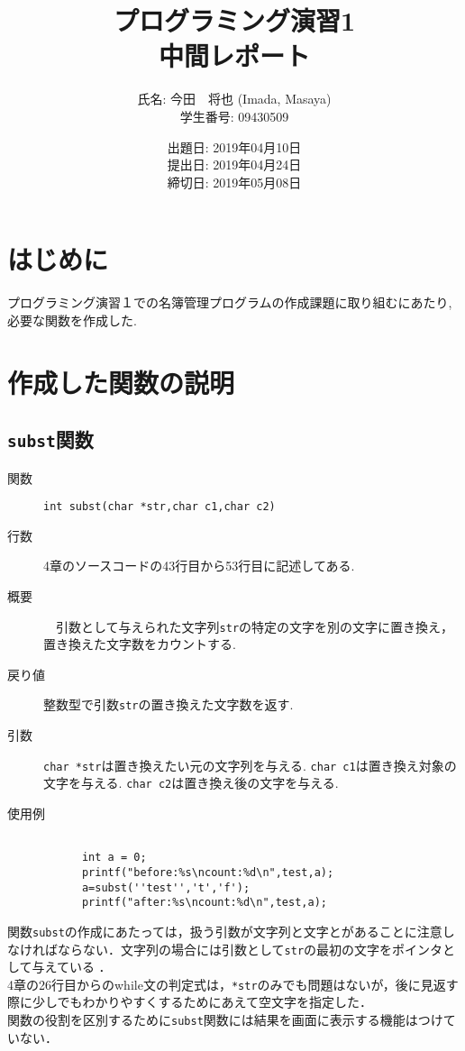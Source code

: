 \documentclass[a4j,11pt]{jarticle}
\title{プログラミング演習1 \\
       中間レポート}
\author{氏名: 今田　将也 (Imada, Masaya) \\
        学生番号: 09430509}
\date{出題日: 2019年04月10日 \\
      提出日: 2019年04月24日 \\
      締切日: 2019年05月08日 \\}  %
\begin{document}
\maketitle

\section{はじめに}
プログラミング演習１での名簿管理プログラムの作成課題に取り組むにあたり, 必要な関数を作成した. 

\section{作成した関数の説明}

\subsection{\texttt{subst}関数}
 \begin{description}
    \item[関数] \verb|int subst(char *str,char c1,char c2)|
    \item[行数]  4章のソースコードの43行目から53行目に記述してある.
    \item[概要]　引数として与えられた文字列\verb|str|の特定の文字を別の文字に置き換え， 置き換えた文字数をカウントする.
    \item[戻り値]整数型で引数\verb|str|の置き換えた文字数を返す.
    \item[引数]  \verb|char *str|は置き換えたい元の文字列を与える. \verb|char c1|は置き換え対象の文字を与える. \verb|char c2|は置き換え後の文字を与える.
    \item[使用例]
      \begin{verbatim}

      int a = 0;
      printf("before:%s\ncount:%d\n",test,a);
      a=subst(''test'','t','f');
      printf("after:%s\ncount:%d\n",test,a);
      \end{verbatim}
	
  \end{description}
関数\verb|subst|の作成にあたっては，扱う引数が文字列と文字とがあることに注意しなければならない．文字列の場合には引数として\verb|str|の最初の文字をポインタとして与えている
．\\4章の26行目からのwhile文の判定式は，\verb|*str|のみでも問題はないが，後に見返す際に少しでもわかりやすくするためにあえて空文字を指定した．\\関数の役割を区別するために\verb|subst|関数には結果を画面に表示する機能はつけていない．
\end{document}

